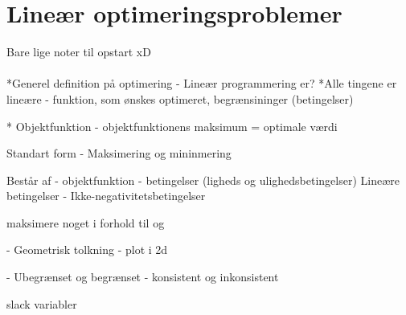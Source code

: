 \chapter{Lineær optimeringsproblemer}
Bare lige noter til opstart xD 
\\\\
*Generel definition på optimering 
- Lineær programmering er? 
*Alle tingene er lineære 
- funktion, som ønskes optimeret, begrænsininger (betingelser) 

* Objektfunktion 
- objektfunktionens maksimum = optimale værdi 

Standart form 
- Maksimering og mininmering 

Består af 
- objektfunktion 
- betingelser (ligheds og ulighedsbetingelser)
	Lineære betingelser 
- Ikke-negativitetsbetingelser

maksimere noget 
i forhold til 
og 

- Geometrisk tolkning 
- plot i 2d 

- Ubegrænset og begrænset 
- konsistent og inkonsistent


slack variabler 

